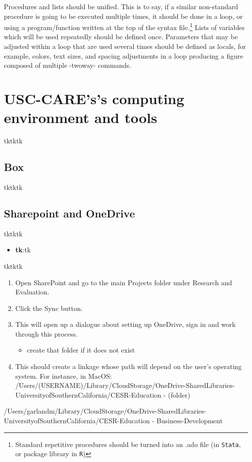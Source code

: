 {Procedures and lists should be unified. This is to say, if a similar non-standard procedure is going to be executed multiple times, it should be done in a loop, or using a program/function written at the top of the syntax file.\footnote{Standard repetitive procedures should be turned into an .ado file (in \texttt{Stata}, or package library in \texttt{R})} Lists of variables which will be used repeatedly should be defined once. Parameters that may be adjusted within a loop that are used several times should be defined as locals, for example, colors, text sizes, and spacing adjustments in a loop producing a figure composed of multiple -twoway- commands.


\section{USC-CARE's\rq{}s computing environment and tools} \label{sec:environment}
tktktk
\subsection{Box}
tktktk
\subsection{Sharepoint and OneDrive}
tktktk
\begin{itemize}
	\item\textbf{tk}:tk
\end{itemize}
tktktk
\begin{enumerate}
	\item Open SharePoint and go to the main Projects folder under Research and Evaluation.
	\item Click the Sync button.
	\item This will open up a dialogue about setting up OneDrive, sign in and work through this process.
	\begin{itemize}
		\item create that folder if it does not exist
	\end{itemize}
	\item This should create a linkage whose path will depend on the user's operating system. For instance, in MacOS: /Users/(USERNAME)/Library/CloudStorage/OneDrive-SharedLibraries-UniversityofSouthernCalifornia/CESR-Education - (folder)
\end{enumerate}

/Users/garlandm/Library/CloudStorage/OneDrive-SharedLibraries-UniversityofSouthernCalifornia/CESR-Education - Business-Development

}
